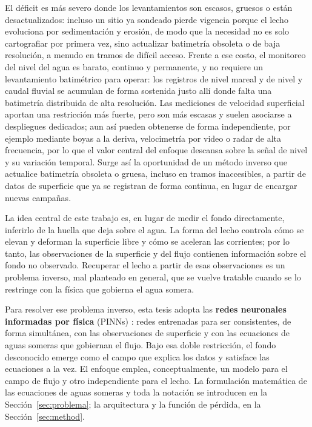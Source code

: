 El déficit es más severo donde los levantamientos son escasos, gruesos o están
desactualizados: incluso un sitio ya sondeado pierde vigencia porque el lecho
evoluciona por sedimentación y erosión, de modo que la necesidad no es solo
cartografiar por primera vez, sino actualizar batimetría obsoleta o de baja
resolución, a menudo en tramos de difícil acceso. Frente a ese costo, el
monitoreo del nivel del agua es barato, continuo y permanente, y no requiere un
levantamiento batimétrico para operar: los registros de nivel mareal y de nivel
y caudal fluvial se acumulan de forma sostenida justo allí donde falta una
batimetría distribuida de alta resolución. Las mediciones de velocidad
superficial aportan una restricción más fuerte, pero son más escasas y suelen
asociarse a despliegues dedicados; aun así pueden obtenerse de forma
independiente, por ejemplo mediante boyas a la deriva, velocimetría por video o
radar de alta frecuencia, por lo que el valor central del enfoque descansa sobre
la señal de nivel y su variación temporal. Surge así la oportunidad de un método
inverso que actualice batimetría obsoleta o gruesa, incluso en tramos
inaccesibles, a partir de datos de superficie que ya se registran de forma
continua, en lugar de encargar nuevas campañas.

La idea central de este trabajo es, en lugar de medir el fondo directamente,
inferirlo de la huella que deja sobre el agua. La forma del lecho controla cómo
se elevan y deforman la superficie libre y cómo se aceleran las corrientes; por
lo tanto, las observaciones de la superficie y del flujo contienen información
sobre el fondo no observado. Recuperar el lecho a partir de esas observaciones
es un problema inverso, mal planteado en general, que se vuelve tratable cuando
se lo restringe con la física que gobierna el agua somera.

Para resolver ese problema inverso, esta tesis adopta las \textbf{redes
neuronales informadas por física} (PINNs) \cite{raissi2019}: redes entrenadas
para ser consistentes, de forma simultánea, con las observaciones de superficie
y con las ecuaciones de aguas someras que gobiernan el flujo. Bajo esa doble
restricción, el fondo desconocido emerge como el campo que explica los datos y
satisface las ecuaciones a la vez. El enfoque emplea, conceptualmente, un
modelo para el campo de flujo y otro independiente para el lecho. La
formulación matemática de las ecuaciones de aguas someras y toda la notación se
introducen en la Sección~\ref{sec:problema}; la arquitectura y la
función de pérdida, en la Sección~\ref{sec:method}.
